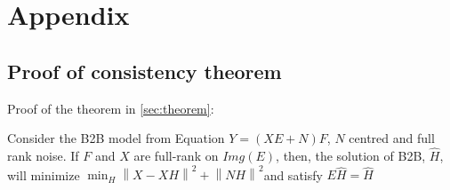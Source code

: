 \newpage
\appendix
\section{Appendix}

\subsection{Proof of consistency theorem}
\label{appendix:theorem_proof}

Proof of the theorem in \ref{sec:theorem}:

\begin{theorem*}

     Consider the B2B model from Equation $Y = (XE + N)F$, $N$ centred and full rank noise.
     If $F$ and $X$ are full-rank on $Img(E)$, then, the solution of B2B, $\hat H$, will minimize
     $\min_H  \left \| X - XH\right\| ^2  + \left \| NH\right \| ^2$and satisfy $E\hat H = \hat H$
\end{theorem*}

